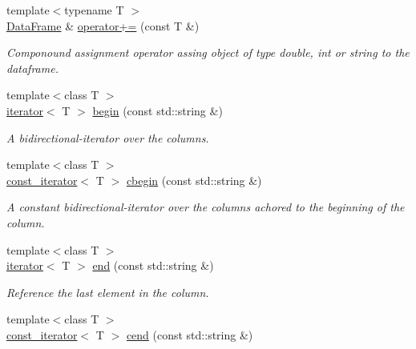 \begin{DoxyCompactItemize}
\mbox{\label{classDataFrame_aa612c8755b333027d3cddc30a8e62386}} 
{\footnotesize template$<$typename T $>$ }\\\hyperlink{classDataFrame}{Data\+Frame} \& \hyperlink{classDataFrame_aa612c8755b333027d3cddc30a8e62386}{operator+=} (const T \&)
\begin{DoxyCompactList}\small\item\em Componound assignment operator assing object of type double, int or string to the dataframe. \end{DoxyCompactList}\item 
{\footnotesize template$<$class T $>$ }\\\hyperlink{classDataFrame_1_1iterator}{iterator}$<$ T $>$ \hyperlink{classDataFrame_abc7986e45f6c9fc145156965bcfd8e7f}{begin} (const std\+::string \&)
\begin{DoxyCompactList}\small\item\em A bidirectional-\/iterator over the columns. \end{DoxyCompactList}\item 
{\footnotesize template$<$class T $>$ }\\\hyperlink{classDataFrame_1_1const__iterator}{const\+\_\+iterator}$<$ T $>$ \hyperlink{classDataFrame_a2c869adf1441f604eaa1e629e7e8c8f4}{cbegin} (const std\+::string \&)
\begin{DoxyCompactList}\small\item\em A constant bidirectional-\/iterator over the columns achored to the beginning of the column. \end{DoxyCompactList}\item 
\mbox{\label{classDataFrame_a925a16eff1840c7711c5342a4fdfab0d}} 
{\footnotesize template$<$class T $>$ }\\\hyperlink{classDataFrame_1_1iterator}{iterator}$<$ T $>$ \hyperlink{classDataFrame_a925a16eff1840c7711c5342a4fdfab0d}{end} (const std\+::string \&)
\begin{DoxyCompactList}\small\item\em Reference the last element in the column. \end{DoxyCompactList}\item 
{\footnotesize template$<$class T $>$ }\\\hyperlink{classDataFrame_1_1const__iterator}{const\+\_\+iterator}$<$ T $>$ \hyperlink{classDataFrame_a89d6883d335d9a92682b88a995fd3547}{cend} (const std\+::string \&)

\end{DoxyCompactItemize}
